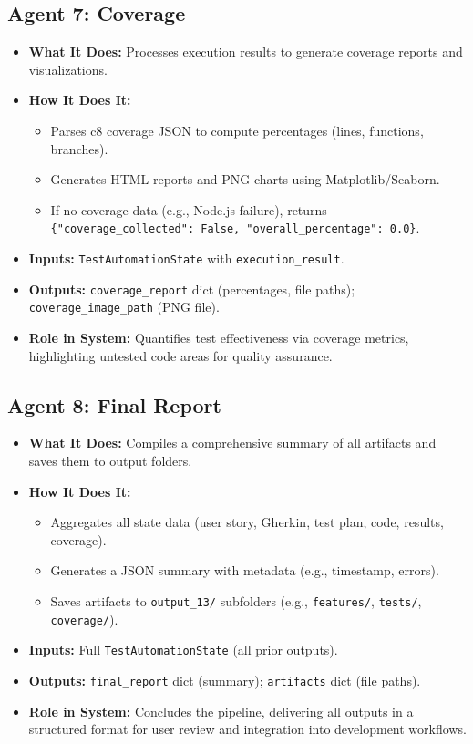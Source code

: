\documentclass{article}
\begin{document}
\subsection{Agent 7: Coverage}
\begin{itemize}
    \item \textbf{What It Does:} Processes execution results to generate coverage reports and visualizations.
    \item \textbf{How It Does It:} 
        \begin{itemize}
            \item Parses c8 coverage JSON to compute percentages (lines, functions, branches).
            \item Generates HTML reports and PNG charts using Matplotlib/Seaborn.
            \item If no coverage data (e.g., Node.js failure), returns \texttt{\{"coverage\_collected": False, "overall\_percentage": 0.0\}}.
        \end{itemize}
    \item \textbf{Inputs:} \texttt{TestAutomationState} with \texttt{execution\_result}.
    \item \textbf{Outputs:} \texttt{coverage\_report} dict (percentages, file paths); \texttt{coverage\_image\_path} (PNG file).
    \item \textbf{Role in System:} Quantifies test effectiveness via coverage metrics, highlighting untested code areas for quality assurance.
\end{itemize}

\subsection{Agent 8: Final Report}
\begin{itemize}
    \item \textbf{What It Does:} Compiles a comprehensive summary of all artifacts and saves them to output folders.
    \item \textbf{How It Does It:} 
        \begin{itemize}
            \item Aggregates all state data (user story, Gherkin, test plan, code, results, coverage).
            \item Generates a JSON summary with metadata (e.g., timestamp, errors).
            \item Saves artifacts to \texttt{output\_13/} subfolders (e.g., \texttt{features/}, \texttt{tests/}, \texttt{coverage/}).
        \end{itemize}
    \item \textbf{Inputs:} Full \texttt{TestAutomationState} (all prior outputs).
    \item \textbf{Outputs:} \texttt{final\_report} dict (summary); \texttt{artifacts} dict (file paths).
    \item \textbf{Role in System:} Concludes the pipeline, delivering all outputs in a structured format for user review and integration into development workflows.
\end{itemize}
\end{document}
